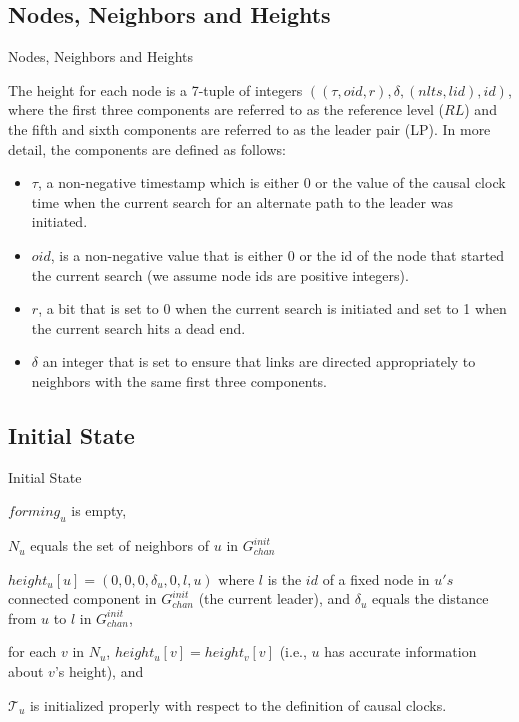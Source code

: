 \documentclass{beamer}
\begin{document}
\subsection{Nodes, Neighbors and Heights}
\begin{frame}{Nodes, Neighbors and Heights}

The height for each node is a 7-tuple of integers $((\tau , oid, r), \delta, (nlts, lid), id)$, where the first three components are referred to as the reference level ($RL$) and the fifth and sixth components are referred to as the leader pair (LP). In more detail, the components are defined as follows:
\pause
\begin{itemize}
	\item $\tau$, a non-negative timestamp which is either 0 or the value of the causal clock time when the current search for an alternate path to the leader was initiated.
	\item $oid$, is a non-negative value that is either 0 or the id of the node that started the current search (we assume node ids are positive integers).
	
\end{itemize}

\end{frame}

\begin{frame}
\begin{itemize}
	\item $r$, a bit that is set to 0 when the current search is initiated and set to 1 when the current search hits a dead end.
	\item $\delta$ an integer that is set to ensure that links are directed appropriately to neighbors with the same first three components.
\end{itemize}
	
\end{frame}

\subsection{Initial State}
\begin{frame}{Initial State}
\begin{list}{--}
	\item $forming_u$ is empty,
	\item $N_u$ equals the set of neighbors of $u$ in $G^{init} _{chan}$
	\item $height_u[u] = (0, 0, 0, \delta _u , 0, l, u)$ where $l$ is the $id$ of a fixed node in $u's$ connected component in $G^{init} _{chan}$ (the current leader), and $\delta _u$ equals the distance from $u$ to $l$ in $G^{init} _{chan}$,
	\item for each $v$ in $N_u$, $height_u[v] = height_v[v]$ (i.e., $u$ has accurate information about $v$’s height), and
	\item $\mathcal{T} _u$ is initialized properly with respect to the definition of causal clocks.
\end{list}
\end{frame}
\end{document}

